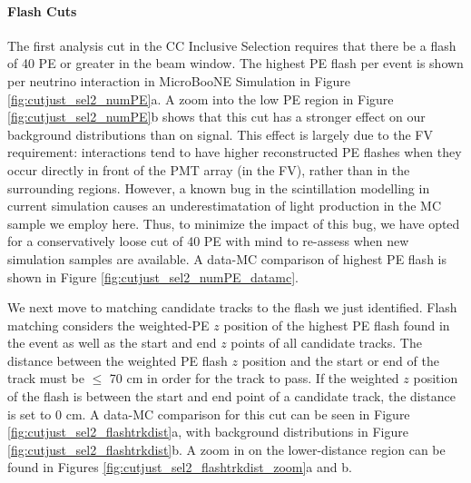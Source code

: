 \paragraph{Flash Cuts}

The first analysis cut in the CC Inclusive Selection requires that there be a flash of 40 PE or greater in the beam window. The highest PE flash per event is shown per neutrino interaction in MicroBooNE Simulation in Figure \ref{fig:cutjust_sel2_numPE}a. A zoom into the low PE region in Figure \ref{fig:cutjust_sel2_numPE}b shows that this cut has a stronger effect on our background distributions than on signal. This effect is largely due to the FV requirement: interactions tend to have higher reconstructed PE flashes when they occur directly in front of the PMT array (in the FV), rather than in the surrounding regions. However, a known bug in the scintillation modelling in current simulation causes an underestimatation of light production in the MC sample we employ here.  Thus, to minimize the impact of this bug, we have opted for a conservatively loose cut of 40 PE with mind to re-assess when new simulation samples are available.  A data-MC comparison of highest PE flash is shown in Figure \ref{fig:cutjust_sel2_numPE_datamc}.
\par We next move to matching candidate tracks to the flash we just identified.  Flash matching considers the weighted-PE $z$ position of the highest PE flash found in the event as well as the start and end $z$ points of all candidate tracks. The distance between the weighted PE flash $z$ position and the start or end of the track must be $\leq$ 70 cm in order for the track to pass. If the weighted $z$ position of the flash is between the start and end point of a candidate track, the distance is set to 0 cm. A data-MC comparison for this cut can be seen in Figure \ref{fig:cutjust_sel2_flashtrkdist}a, with background distributions in Figure \ref{fig:cutjust_sel2_flashtrkdist}b.  A zoom in on the lower-distance region can be found in Figures \ref{fig:cutjust_sel2_flashtrkdist_zoom}a and b. 



